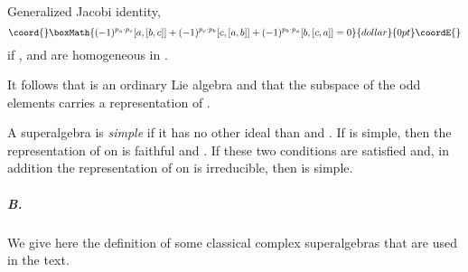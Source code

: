 \documentclass[a4paper,12pt]{article}
\begin{document}
\smallskip

 Generalized Jacobi identity, $$\coord{}\boxMath{(-1)^{p_a\cdot
p_c}[a,[b,c]]+(-1)^{p_c\cdot p_b}[c,[a,b]]+(-1)^{p_b\cdot
p_a}[b,[c,a]]=0}{dollar}{0pt}\coordE{}$$ if \coordHE{}, \coordHE{} and \coordHE{} are homogeneous in \myHighlight{$\fg$}\coordHE{}.

\smallskip

It follows that \coordHE{} is an ordinary Lie algebra and that the
subspace of the odd elements \coordHE{} carries a representation of
\coordHE{}.

\bigskip

A superalgebra \myHighlight{$\fg$}\coordHE{} is {\it simple} if it has no other ideal than
\coordHE{} and \myHighlight{$\fg$}\coordHE{}. If \myHighlight{$\fg$}\coordHE{} is simple, then the representation of
\coordHE{} on \coordHE{} is faithful and \coordHE{}.  If
these two conditions are satisfied and, in addition the
representation of \coordHE{} on \coordHE{} is irreducible, then \myHighlight{$\fg$}\coordHE{} is
simple.

\subparagraph{B.} We give here the definition of some classical
complex superalgebras that are used in the text.

\bigskip
\end{document}
